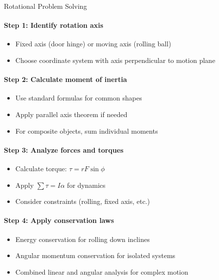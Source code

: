 \begin{KR}{Rotational Problem Solving}\\
    \paragraph{Step 1: Identify rotation axis}
    \begin{itemize}
        \item Fixed axis (door hinge) or moving axis (rolling ball)
        \item Choose coordinate system with axis perpendicular to motion plane
    \end{itemize}
    
    \paragraph{Step 2: Calculate moment of inertia}
    \begin{itemize}
        \item Use standard formulas for common shapes
        \item Apply parallel axis theorem if needed
        \item For composite objects, sum individual moments
    \end{itemize}
    
    \paragraph{Step 3: Analyze forces and torques}
    \begin{itemize}
        \item Calculate torque: $\tau = rF\sin\phi$
        \item Apply $\sum \tau = I\alpha$ for dynamics
        \item Consider constraints (rolling, fixed axis, etc.)
    \end{itemize}
    
    \paragraph{Step 4: Apply conservation laws}
    \begin{itemize}
        \item Energy conservation for rolling down inclines
        \item Angular momentum conservation for isolated systems
        \item Combined linear and angular analysis for complex motion
    \end{itemize}
\end{KR}

